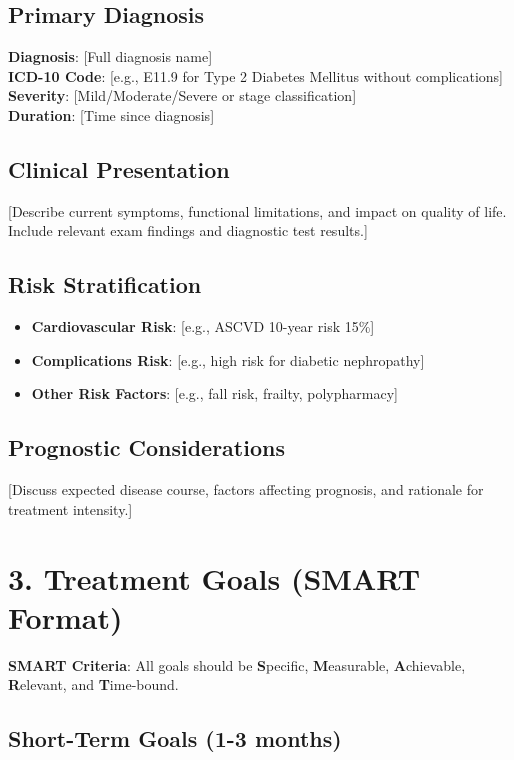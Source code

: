 \documentclass[11pt,letterpaper]{article}
\begin{document}
\subsection*{Primary Diagnosis}
\textbf{Diagnosis}: [Full diagnosis name]\\
\textbf{ICD-10 Code}: [e.g., E11.9 for Type 2 Diabetes Mellitus without complications]\\
\textbf{Severity}: [Mild/Moderate/Severe or stage classification]\\
\textbf{Duration}: [Time since diagnosis]

\subsection*{Clinical Presentation}
[Describe current symptoms, functional limitations, and impact on quality of life. Include relevant exam findings and diagnostic test results.]

\subsection*{Risk Stratification}
\begin{itemize}[leftmargin=*]
    \item \textbf{Cardiovascular Risk}: [e.g., ASCVD 10-year risk 15\%]
    \item \textbf{Complications Risk}: [e.g., high risk for diabetic nephropathy]
    \item \textbf{Other Risk Factors}: [e.g., fall risk, frailty, polypharmacy]
\end{itemize}

\subsection*{Prognostic Considerations}
[Discuss expected disease course, factors affecting prognosis, and rationale for treatment intensity.]

\section*{3. Treatment Goals (SMART Format)}

\textbf{SMART Criteria}: All goals should be \textbf{S}pecific, \textbf{M}easurable, \textbf{A}chievable, \textbf{R}elevant, and \textbf{T}ime-bound.

\subsection*{Short-Term Goals (1-3 months)}
\end{document}
